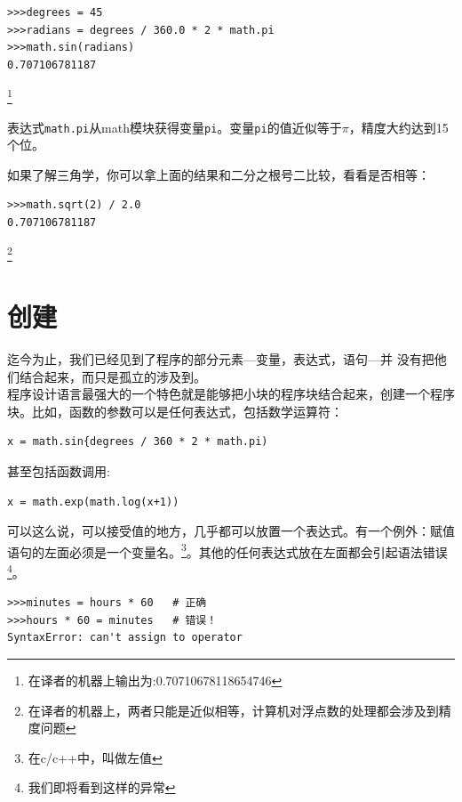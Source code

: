 \beforeverb
\begin{verbatim}
>>>degrees = 45
>>>radians = degrees / 360.0 * 2 * math.pi
>>>math.sin(radians)
0.707106781187
\end{verbatim}
\afterverb \footnote{在译者的机器上输出为:0.70710678118654746}

表达式{\tt math.pi}从math模块获得变量{\tt pi}。变量{\tt pi}的值近似等于$\pi$，精度大约达到15个位。


如果了解三角学，你可以拿上面的结果和二分之根号二比较，看看是否相等：



\beforeverb
\begin{verbatim}
>>>math.sqrt(2) / 2.0
0.707106781187
\end{verbatim}
\afterverb \footnote{在译者的机器上，两者只能是近似相等，计算机对浮点数的处理都会涉及到精度问题}


\section{创建}

迄今为止，我们已经见到了程序的部分元素---变量，表达式，语句---并
没有把他们结合起来，而只是孤立的涉及到。\\

程序设计语言最强大的一个特色就是能够把小块的程序块结合起来，创建一个程序块。比如，函数的参数可以是任何表达式，包括数学运算符：

\beforeverb
\begin{verbatim}
x = math.sin{degrees / 360 * 2 * math.pi)
\end{verbatim}
\afterverb

甚至包括函数调用:

\beforeverb
\begin{verbatim}
x = math.exp(math.log(x+1))
\end{verbatim}
\afterverb

	
可以这么说，可以接受值的地方，几乎都可以放置一个表达式。有一个例外：赋值语句的左面必须是一个变量名。\footnote{在c/c++中，叫做左值}。其他的任何表达式放在左面都会引起语法错误\footnote{我们即将看到这样的异常}。

\beforeverb
\begin{verbatim}
>>>minutes = hours * 60   # 正确
>>>hours * 60 = minutes   # 错误！
SyntaxError: can't assign to operator
\end{verbatim}
\afterverb

